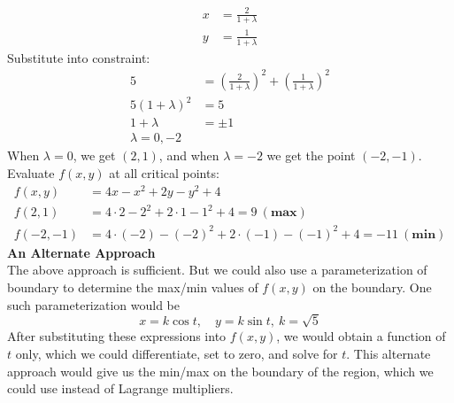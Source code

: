 {\begin{align*}
        x&=\frac{2}{1+\lambda} \\
        y&=\frac{1}{1+\lambda}
    \end{align*}
    Substitute into constraint: 
    \begin{align*}
        5 &=\left(\frac{2}{1+\lambda}\right)^2 + \left(\frac{1}{1+\lambda}\right)^2 \\
        5(1+\lambda)^2 &= 5 \\
        1 + \lambda &= \pm 1 \\
        \lambda = 0, -2
    \end{align*}
    When $\lambda = 0$, we get $(2,1)$, and when $\lambda = -2$ we get the point $(-2,-1)$. 
    Evaluate $f(x,y)$ at all critical points:
    \begin{align*}
        f(x,y) &= 4x - x^2 + 2y - y^2  + 4\\
        f(2,1) &= 4\cdot 2 - 2^2 + 2\cdot1 - 1^2+4 = 9 \ (\textbf{max})\\
        f(-2,-1) &= 4\cdot (-2) - (-2)^2 + 2\cdot(-1) - (-1)^2+4 = -11 \ (\textbf{min})
    \end{align*}
    \textbf{An Alternate Approach}\\
    The above approach is sufficient. But we could also use a parameterization of boundary to determine the max/min values of $f(x,y)$ on the boundary. One such parameterization would be $$x = k\cos t, \quad y = k\sin t, \ k = \sqrt5$$
    After substituting these expressions into $f(x,y)$, we would obtain a function of $t$ only, which we could differentiate, set to zero, and solve for $t$. This alternate approach would give us the min/max on the boundary of the region, which we could use instead of Lagrange multipliers. 
    } 
   \else
   \fi

\fi 






\ifnum {}

